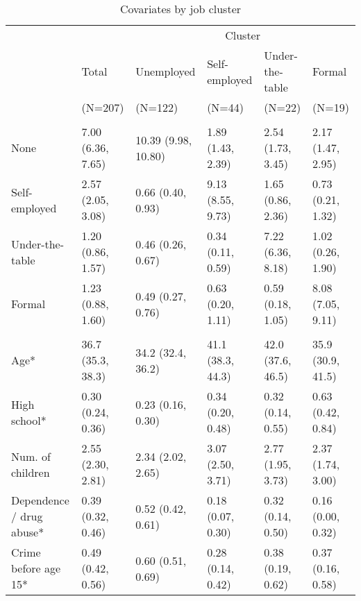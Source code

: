 
\begin{table}[htp]
\scriptsize
\caption{Covariates by job cluster}
\label{tab:desc_job_clusters}
\setlength{\tabcolsep}{5pt}
\renewcommand{\arraystretch}{1.3}
\begin{threeparttable}
\begin{tabular}{llllll}
\hline
\addlinespace[8pt]
& & \multicolumn{4}{c}{Cluster} \\
\addlinespace
\cmidrule(lr){3-6} 
\addlinespace
& \multicolumn{1}{l}{Total} & \multicolumn{1}{l}{Unemployed} & \multicolumn{1}{l}{Self-employed} & \multicolumn{1}{l}{Under-the-table} & \multicolumn{1}{l}{Formal} \\& \multicolumn{1}{l}{(N=207)} & \multicolumn{1}{l}{(N=122)} 
        & \multicolumn{1}{l}{(N=44)} & \multicolumn{1}{l}{(N=22)} 
        & \multicolumn{1}{l}{(N=19)} \\\addlinespace[8pt]
\hline
\addlinespace[12pt]
\multicolumn{6}{l}{\textbf{Time spent on job (months)}} \\
\addlinespace
\quad None & 7.00 (6.36, 7.65) & 10.39 (9.98, 10.80) & 1.89 (1.43, 2.39) & 2.54 (1.73, 3.45) & 2.17 (1.47, 2.95) \\ 
  \quad Self-employed & 2.57 (2.05, 3.08) & 0.66 (0.40, 0.93) & 9.13 (8.55, 9.73) & 1.65 (0.86, 2.36) & 0.73 (0.21, 1.32) \\ 
  \quad Under-the-table & 1.20 (0.86, 1.57) & 0.46 (0.26, 0.67) & 0.34 (0.11, 0.59) & 7.22 (6.36, 8.18) & 1.02 (0.26, 1.90) \\ 
  \quad Formal & 1.23 (0.88, 1.60) & 0.49 (0.27, 0.76) & 0.63 (0.20, 1.11) & 0.59 (0.18, 1.05) & 8.08 (7.05, 9.11) \\ 
  \addlinespace[12pt]
\multicolumn{6}{l}{\textbf{Covariates (average)*}} \\
\addlinespace
\quad Age* & 36.7 (35.3, 38.3) & 34.2 (32.4, 36.2) & 41.1 (38.3, 44.3) & 42.0 (37.6, 46.5) & 35.9 (30.9, 41.5) \\ 
  \quad High school* & 0.30 (0.24, 0.36) & 0.23 (0.16, 0.30) & 0.34 (0.20, 0.48) & 0.32 (0.14, 0.55) & 0.63 (0.42, 0.84) \\ 
  \quad Num. of children & 2.55 (2.30, 2.81) & 2.34 (2.02, 2.65) & 3.07 (2.50, 3.71) & 2.77 (1.95, 3.73) & 2.37 (1.74, 3.00) \\ 
  \quad Dependence / drug abuse* & 0.39 (0.32, 0.46) & 0.52 (0.42, 0.61) & 0.18 (0.07, 0.30) & 0.32 (0.14, 0.50) & 0.16 (0.00, 0.32) \\ 
  \quad Crime before age 15* & 0.49 (0.42, 0.56) & 0.60 (0.51, 0.69) & 0.28 (0.14, 0.42) & 0.38 (0.19, 0.62) & 0.37 (0.16, 0.58) \\ 

\end{tabular}
\end{threeparttable}
\end{table}
